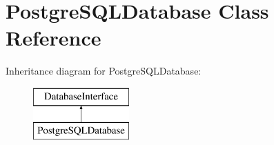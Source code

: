 \hypertarget{class_postgre_s_q_l_database}{}\section{Postgre\+S\+Q\+L\+Database Class Reference}
\label{class_postgre_s_q_l_database}
Inheritance diagram for Postgre\+S\+Q\+L\+Database\+:\begin{figure}[H]
\begin{center}
\leavevmode
\includegraphics[height=2.000000cm]{class_postgre_s_q_l_database}
\end{center}
\end{figure}
